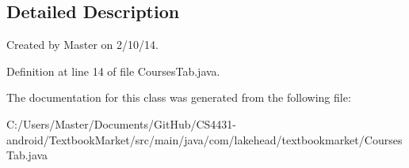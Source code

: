 \subsection{Detailed Description}
Created by Master on 2/10/14. 

Definition at line 14 of file Courses\-Tab.\-java.



The documentation for this class was generated from the following file\-:\begin{DoxyCompactItemize}
\item 
C\-:/\-Users/\-Master/\-Documents/\-Git\-Hub/\-C\-S4431-\/android/\-Textbook\-Market/src/main/java/com/lakehead/textbookmarket/Courses\-Tab.\-java\end{DoxyCompactItemize}
